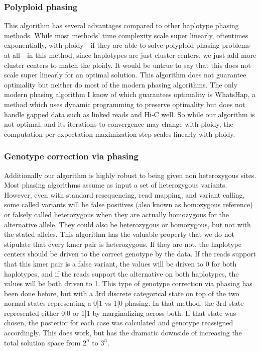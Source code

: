 \subsubsection{Polyploid phasing}
\par{
This algorithm has several advantages compared to other haplotype phasing methods. While most methods' time complexity scale super linearly, oftentimes exponentially, with ploidy---if they are able to solve polyploid phasing problems at all---in this method, since haplotypes are just cluster centers, we just add more cluster centers to match the ploidy. It would be untrue to say that this does not scale super linearly for an optimal solution. This algorithm does not guarantee optimality but neither do most of the modern phasing algorithms. The only modern phasing algorithm I know of which guarantees optimality is WhatsHap, a method which uses dynamic programming to preserve optimality but does not handle gapped data such as linked reads and Hi-C well\cite{whatshap}. So while our algorithm is not optimal, and its iterations to convergence may change with ploidy, the computation per expectation maximization step scales linearly with ploidy.
}
\subsubsection{Genotype correction via phasing}

\par{
Additionally our algorithm is highly robust to being given non heterozygous sites. Most phasing algorithms assume as input a set of heterozygous variants. However, even with standard resequencing, read mapping, and variant calling, some called variants will be false positives (also known as homozygous reference) or falsely called heterozygous when they are actually homozygous for the alternative allele. They could also be heterozygous or homozygous, but not with the stated alleles. This algorithm has the valuable property that we do not stipulate that every kmer pair is heterozygous. If they are not, the haplotype centers should be driven to the correct genotype by the data. If the reads support that this kmer pair is a false variant, the values will be driven to 0 for both haplotypes, and if the reads support the alternative on both haplotypes, the values will be both driven to 1. This type of genotype correction via phasing has been done before, but with a 3rd discrete categorical state on top of the two normal states representing a 0|1 vs 1|0 phasing\cite{mypatent}. In that method, the 3rd state represented either 0|0 or 1|1 by marginalizing across both. If that state was chosen, the posterior for each case was calculated and genotype reassigned accordingly. This does work, but has the dramatic downside of increasing the total solution space from $2^n$ to $3^n$.
} \\


